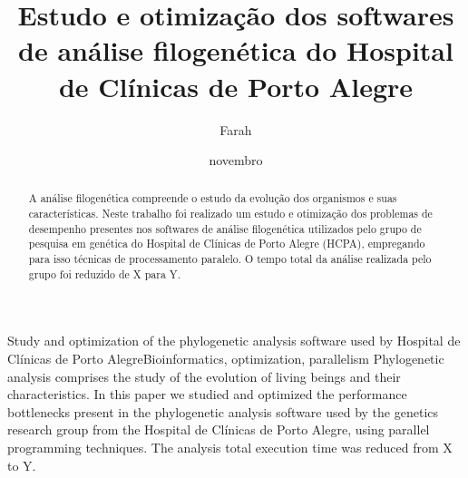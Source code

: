 \documentclass[cic,tc]{iiufrgs}
\title{Estudo e otimização dos softwares de análise filogenética do Hospital de
Clínicas de Porto Alegre}
\author{Farah}{Alef}
\date{novembro}{2021}
\begin{document}
\maketitle



\begin{abstract}
  A análise filogenética compreende o estudo da evolução dos organismos e suas
  características. Neste trabalho foi realizado um estudo e otimização dos
  problemas de desempenho presentes nos softwares de análise filogenética
  utilizados pelo grupo de pesquisa em genética do Hospital de Clínicas de
  Porto Alegre (HCPA), empregando para isso técnicas de processamento paralelo.
  O tempo total da análise realizada pelo grupo foi reduzido de X para Y. %
\end{abstract}

\begin{englishabstract}{Study and optimization of the phylogenetic analysis software used by Hospital de Clínicas de Porto Alegre}{Bioinformatics, optimization, parallelism} Phylogenetic analysis comprises the study of the evolution of living beings and their characteristics. In this paper we studied and optimized the performance bottlenecks present in the phylogenetic analysis software used by the genetics research group from the Hospital de Clínicas de Porto Alegre, using parallel programming techniques. The analysis total execution time was reduced from X to Y. %
\end{englishabstract}
\end{document}
